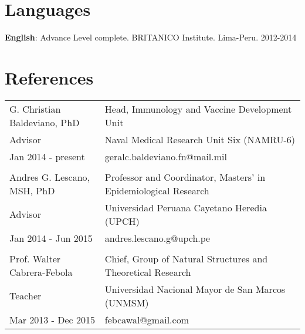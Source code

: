 \documentclass[margin,line]{res}
\begin{document}
\begin{resume}
\section{\sc Languages}
{\bf English}: Advance Level complete. BRITANICO Institute. Lima-Peru. \hfill {2012-2014} \\%


\section{\sc References }

\begin{tabular}{ l l }
	G. Christian Baldeviano, PhD & Head, Immunology and Vaccine Development Unit \\
	Advisor & Naval Medical Research Unit Six (NAMRU-6)\\
	Jan 2014 - present & geralc.baldeviano.fn@mail.mil\\
	&\\
	Andres G. Lescano, MSH, PhD & Professor and Coordinator, Masters' in Epidemiological Research\\
	Advisor & Universidad Peruana Cayetano Heredia (UPCH)\\
	Jan 2014 - Jun 2015 & andres.lescano.g@upch.pe\\
	&\\
	Prof. Walter Cabrera-Febola & Chief, Group of Natural Structures and Theoretical Research \\
	Teacher & Universidad Nacional Mayor de San Marcos (UNMSM)\\
	Mar 2013 - Dec 2015 & febcawal@gmail.com\\	
\end{tabular}




\end{resume}
\end{document}
